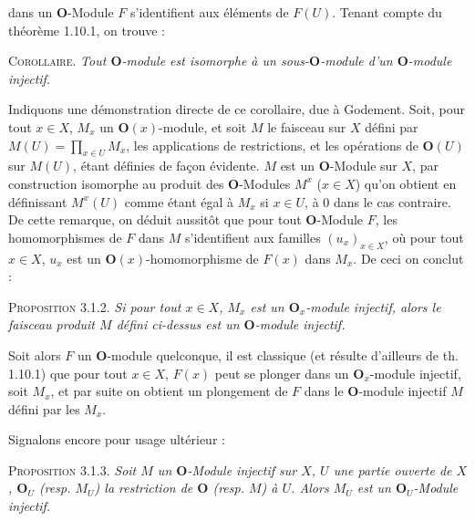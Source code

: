 
\noindent dans un $\mathbf O$-Module $F$ s'identifient aux éléments de $F(U)$.
Tenant compte du théorème 1.10.1, on trouve :

\indent\textsc{Corollaire.} \textit{Tout $\mathbf O$-module est isomorphe à un
sous-$\mathbf O$-module d'un $\mathbf O$-module injectif.}

Indiquons une démonstration directe de ce corollaire, due à Godement. Soit,
pour tout $x\in X$, $M_x$ un $\mathbf O(x)$-module, et soit $M$ le faisceau
sur $X$ défini par
$M(U)=\displaystyle\prod_{x\in U}M_x$,
les applications de restrictions, et les opérations de $\mathbf O(U)$ sur
$M(U)$, étant définies de façon évidente. $M$ est un $\mathbf O$-Module sur
$X$, par construction isomorphe au produit des $\mathbf O$-Modules $M^x$
($x\in X$) qu'on obtient en définissant $M^x(U)$ comme étant égal à $M_x$ si
$x\in U$, à 0 dans le cas contraire. De cette remarque, on déduit aussitôt
que pour tout $\mathbf O$-Module $F$, les homomorphismes de $F$ dans $M$
s'identifient aux familles $(u_x)_{x\in X}$, où pour tout $x\in X$, $u_x$ est
un $\mathbf O(x)$-homomorphisme de $F(x)$ dans $M_x$. De ceci on conclut :

\indent\textsc{Proposition 3.1.2.} \textit{Si pour tout $x\in X$, $M_x$ est un
$\mathbf O_x$-module injectif, alors le faisceau produit $M$ défini ci-dessus
est un $\mathbf O$-module injectif.}

Soit alors $F$ un $\mathbf O$-module quelconque, il est classique (et résulte
d'ailleurs de th. 1.10.1) que pour tout $x\in X$, $F(x)$ peut se plonger dans
un $\mathbf O_x$-module injectif, soit $M_x$, et par suite on obtient un
plongement de $F$ dans le $\mathbf O$-module injectif $M$ défini par les
$M_x$.

Signalons encore pour usage ultérieur :

\indent\textsc{Proposition 3.1.3.} \textit{Soit $M$ un $\mathbf O$-Module
injectif sur $X$, $U$ une partie ouverte de $X$, $\mathbf O_U$ \textup{(}resp. $M_U$\textup{)}
la restriction de $\mathbf O$ \textup{(}resp. $M$\textup{)} à $U$. Alors $M_U$ est un
$\mathbf O_U$-Module injectif.}

